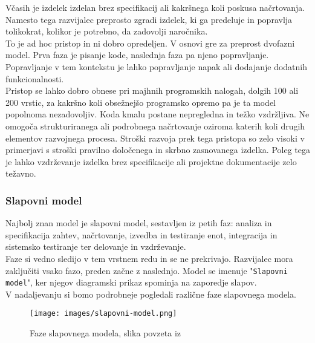 \documentclass[a4paper,12pt,openright]{book}
\begin{document}
Včasih je izdelek izdelan brez specifikacij ali kakršnega koli poskusa načrtovanja. Namesto tega razvijalec preprosto zgradi izdelek, ki ga predeluje in popravlja tolikokrat, kolikor je potrebno, da zadovolji naročnika. \\
To je ad hoc pristop in ni dobro opredeljen. V osnovi gre za preprost dvofazni model. Prva faza je pisanje kode, naslednja faza pa njeno popravljanje. Popravljanje v tem kontekstu je lahko popravljanje napak ali dodajanje dodatnih funkcionalnosti. \\
Pristop se lahko dobro obnese pri majhnih programskih nalogah, dolgih 100 ali 200 vrstic, za kakršno koli obsežnejšo programsko opremo  pa je ta model popolnoma nezadovoljiv. Koda kmalu postane nepregledna in težko vzdržljiva. Ne omogoča strukturiranega ali podrobnega načrtovanje oziroma katerih koli drugih elementov razvojnega procesa. Stroški razvoja prek tega pristopa so zelo visoki v primerjavi s stroški pravilno določenega in skrbno zasnovanega izdelka. Poleg tega je lahko vzdrževanje izdelka brez specifikacije ali projektne dokumentacije zelo težavno. \cite{schach1996classical}
\subsubsection{Slapovni model}
Najbolj znan model je slapovni model, sestavljen iz petih faz: analiza in specifikacija zahtev, načrtovanje, izvedba in testiranje enot, integracija in sistemsko testiranje ter delovanje in vzdrževanje. \\
Faze si vedno sledijo v tem vrstnem redu in se ne prekrivajo. Razvijalec mora zaključiti vsako fazo, preden začne z naslednjo. Model se imenuje "\texttt{Slapovni model}", ker njegov diagramski prikaz spominja na zaporedje slapov. \cite{aggarwal2005software} \\
V nadaljevanju si bomo podrobneje pogledali različne faze slapovnega modela.

\begin{figure}[H]
    \centering
    \texttt{[image: images/slapovni-model.png]}
    \caption{Faze slapovnega modela, slika povzeta iz \cite{mercun2012}}
    \label{fig:enter-label}
\end{figure}
\end{document}
